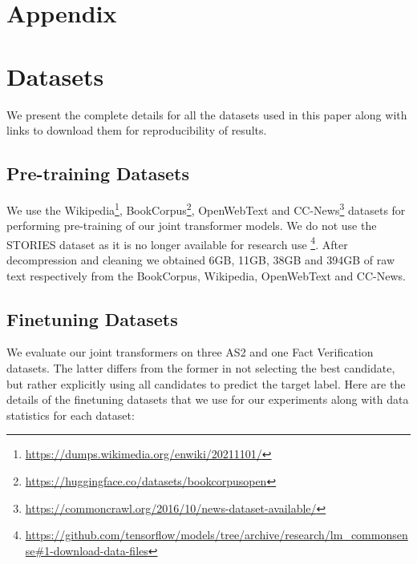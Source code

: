 \appendix

\section*{Appendix}

\section{Datasets}
\label{app:datasets}

We present the complete details for all the datasets used in this paper along with links to download them for reproducibility of results.

\subsection{Pre-training Datasets}
We use the Wikipedia\footnote{\url{https://dumps.wikimedia.org/enwiki/20211101/}}, BookCorpus\footnote{\url{https://huggingface.co/datasets/bookcorpusopen}}, OpenWebText \citep{Gokaslan2019OpenWeb} and CC-News\footnote{\url{https://commoncrawl.org/2016/10/news-dataset-available/}} datasets for performing pre-training of our joint transformer models. We do not use the STORIES dataset as it is no longer available for research use \footnote{\url{https://github.com/tensorflow/models/tree/archive/research/lm\_commonsense\#1-download-data-files}}. After decompression and cleaning we obtained 6GB, 11GB, 38GB and 394GB of raw text respectively from the BookCorpus, Wikipedia, OpenWebText and CC-News.

\subsection{Finetuning Datasets}
We evaluate our joint transformers on three AS2 and one Fact Verification datasets. The latter differs from the former in not selecting the best candidate, but rather explicitly using all candidates to predict the target label.
Here are the details of the finetuning datasets that we use for our experiments along with data statistics for each dataset:


